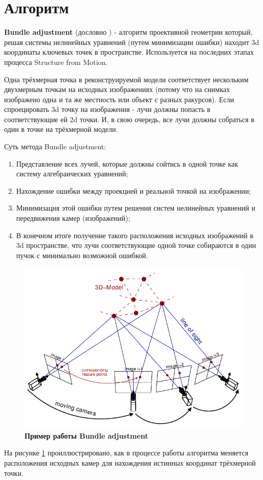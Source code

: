 \section{Алгоритм }

\textbf{Bundle adjustment} (дословно ) - алгоритм проективной геометрии который, решая системы нелинейных уравнений (путем минимизации ошибки) находит 3d координаты ключевых точек в пространстве. Используется на последних этапах процесса Structure from Motion.
 
Одна трёхмерная точка в реконструируемой модели соответствует нескольким двухмерным точкам на исходных изображениях (потому что на снимках изображено одна и та же местность или объект с разных ракурсов). Если спроецировать 3d точку на изображения - лучи должны попасть в соответствующие ей 2d точки. И, в свою очередь, все лучи должны собраться в один  в точке на трёхмерной модели.

\vspace{1mm}
Суть метода Bundle adjustment:

\begin{enumerate}
    \item Представление всех лучей, которые должны сойтись в одной точке как систему алгебраических уравнений;
    \item Нахождение ошибки между проекцией и реальной точкой на изображении;
    \item Минимизация этой ошибки путем решения систем нелинейных уравнений и передвижения камер (изображений);
    \item В конечном итоге получение такого расположения исходных изображений в 3d пространстве, что лучи соответствующие одной точке собираются в один пучок с минимально возможной ошибкой.
\end{enumerate}

\begin{figure}[h]
    \centering
    \includegraphics[width=1\textwidth]{images/bundle_adjustment.png}
    \caption{\textbf{Пример работы Bundle adjustment}}
    \label{fig:ba}
\end{figure}

На рисунке \ref{fig:ba} проиллюстрировано, как в процессе работы алгоритма меняется расположения исходных камер для нахождения истинных координат трёхмерной точки.
